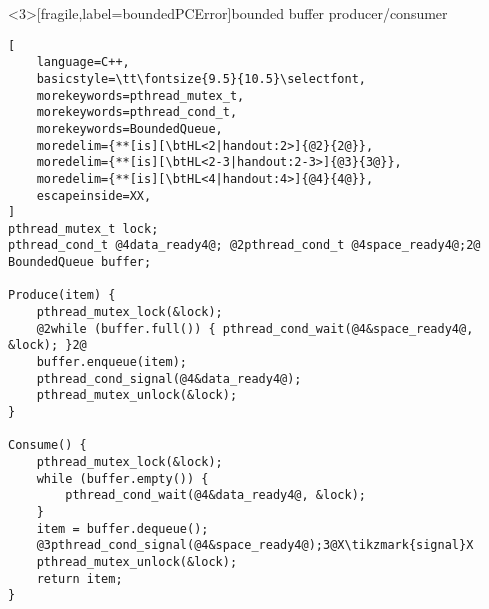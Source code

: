 \usetikzlibrary{arrows.meta}

\begin{frame}<3>[fragile,label=boundedPCError]{bounded buffer producer/consumer}
\vspace{-.5cm}
\begin{lstlisting}[
    language=C++,
    basicstyle=\tt\fontsize{9.5}{10.5}\selectfont,
    morekeywords=pthread_mutex_t,
    morekeywords=pthread_cond_t,
    morekeywords=BoundedQueue,
    moredelim={**[is][\btHL<2|handout:2>]{@2}{2@}}, 
    moredelim={**[is][\btHL<2-3|handout:2-3>]{@3}{3@}}, 
    moredelim={**[is][\btHL<4|handout:4>]{@4}{4@}}, 
    escapeinside=XX,
]
pthread_mutex_t lock;
pthread_cond_t @4data_ready4@; @2pthread_cond_t @4space_ready4@;2@
BoundedQueue buffer;

Produce(item) {
    pthread_mutex_lock(&lock);
    @2while (buffer.full()) { pthread_cond_wait(@4&space_ready4@, &lock); }2@
    buffer.enqueue(item);
    pthread_cond_signal(@4&data_ready4@);
    pthread_mutex_unlock(&lock);
}

Consume() {
    pthread_mutex_lock(&lock);
    while (buffer.empty()) {
        pthread_cond_wait(@4&data_ready4@, &lock);
    }
    item = buffer.dequeue();
    @3pthread_cond_signal(@4&space_ready4@);3@X\tikzmark{signal}X
    pthread_mutex_unlock(&lock);
    return item;
}
\end{lstlisting}
\end{frame}

